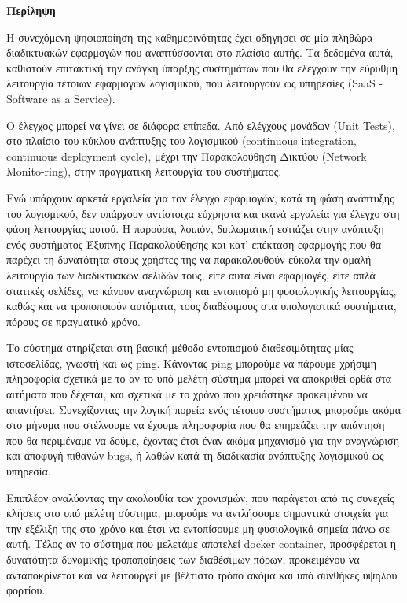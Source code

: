 \begin{center}
  \centering

  \vspace{0.5cm}
  \centering
  \textbf{\Large{Περίληψη}}

  \vspace{1cm}

\end{center}

  Η συνεχόμενη ψηφιοποίηση της καθημερινότητας έχει οδηγήσει σε μία πληθώρα διαδικτυακών εφαρμογών
  που αναπτύσσονται στο πλαίσιο αυτής. Τα δεδομένα αυτά, καθιστούν επιτακτική την ανάγκη ύπαρξης συστημάτων
  που θα ελέγχουν την εύρυθμη λειτουργία τέτοιων εφαρμογών λογισμικού, που λειτουργούν ως
  υπηρεσίες (SaaS - Software as a Service).
  
  Ο έλεγχος μπορεί να γίνει σε διάφορα επίπεδα. Από ελέγχους μονάδων (Unit Tests), στο πλαίσιο
  του κύκλου ανάπτυξης του λογισμικού (continuous integration, continuous deployment cycle), μέχρι την
  Παρακολούθηση Δικτύου (Network Monito\hyp{}ring), στην πραγματική λειτουργία του συστήματος.  
  
  Ενώ υπάρχουν αρκετά εργαλεία για τον έλεγχο εφαρμογών, κατά τη φάση ανάπτυξης του λογισμικού, δεν υπάρχουν αντίστοιχα εύχρηστα και ικανά εργαλεία για έλεγχο στη φάση λειτουργίας αυτού. Η παρούσα, λοιπόν, διπλωματική εστιάζει στην ανάπτυξη ενός συστήματος Έξυπνης Παρακολούθησης και κατ' επέκταση εφαρμογής που θα παρέχει τη δυνατότητα στους χρήστες της να παρακολουθούν εύκολα την ομαλή λειτουργία των διαδικτυακών σελιδών τους, είτε αυτά είναι εφαρμογές, είτε απλά στατικές σελίδες, να κάνουν αναγνώριση και εντοπισμό μη φυσιολογικής λειτουργίας, καθώς και να τροποποιούν αυτόματα, τους διαθέσιμους στα υπολογιστικά συστήματα, πόρους σε πραγματικό χρόνο.
  
  Το σύστημα στηρίζεται στη βασική μέθοδο εντοπισμού διαθεσιμότητας μίας ιστοσελίδας, γνωστή και
  ως ping. Κάνοντας ping μπορούμε να πάρουμε χρήσιμη πληροφορία σχετικά με το αν το υπό μελέτη σύστημα
  μπορεί να αποκριθεί ορθά στα αιτήματα που δέχεται, και σχετικά με το χρόνο που χρειάστηκε προκειμένου
  να απαντήσει. Συνεχίζοντας την λογική πορεία ενός τέτοιου συστήματος μπορούμε ακόμα στο μήνυμα που στέλνουμε να έχουμε πληροφορία που θα επηρεάζει την απάντηση που θα περιμέναμε να δούμε, έχοντας έτσι έναν ακόμα μηχανισμό για την αναγνώριση και αποφυγή πιθανών bugs, ή λαθών κατά τη διαδικασία ανάπτυξης λογισμικού ως υπηρεσία.
  
  Επιπλέον αναλύοντας την ακολουθία των χρονισμών, που παράγεται από τις συνεχείς κλήσεις στο υπό μελέτη σύστημα, μπορούμε να αντλήσουμε σημαντικά στοιχεία για την εξέλιξη της στο χρόνο και έτσι να εντοπίσουμε μη φυσιολογικά σημεία πάνω σε αυτή. Τέλος αν το σύστημα που μελετάμε αποτελεί docker container, προσφέρεται η δυνατότητα δυναμικής τροποποίησεις των διαθέσιμων πόρων, προκειμένου να ανταποκρίνεται και να λειτουργεί με βέλτιστο τρόπο ακόμα και υπό συνθήκες υψηλού φορτίου.
